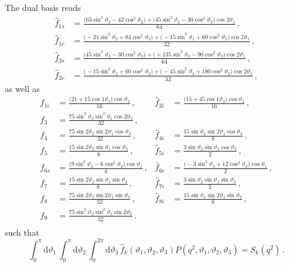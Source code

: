 \documentclass[aps,prd,reprint,nofootinbib,preprintnumbers]{revtex4}
\newcommand{\rmdx}[1]{\mbox{d} #1 \,} %
\renewcommand{\theta}{\vartheta}
\begin{document}
The dual basis reads
\begin{equation}
\begin{aligned}
    \hat{f}_{1s} & = \frac{\big( 63 \sin^2\theta_2 - 42 \cos^2\theta_2\big) + \big(  45 \sin^2\theta_2 - 30 \cos^2\theta_2\big)\cos 2\theta_1}{64} \,,\\
    \hat{f}_{1c} & = \frac{\big(-21 \sin^2\theta_2 + 84 \cos^2\theta_2\big) + \big( -15 \sin^2\theta_2 + 60 \cos^2\theta_2\big)\cos 2\theta_1}{32} \,,\\
    \hat{f}_{2s} & = \frac{\big( 45 \sin^2\theta_2 - 30 \cos^2\theta_2\big) + \big(+135 \sin^2\theta_2 - 90 \cos^2\theta_2\big)\cos 2\theta_1}{64} \,,\\
    \hat{f}_{2c} & = \frac{\big(-15 \sin^2\theta_2 + 60 \cos^2\theta_2\big) + \big( -45 \sin^2\theta_2 +180 \cos^2\theta_2\big)\cos 2\theta_1}{32} \,,
\end{aligned}
\end{equation}
as well as
\begin{equation}
\begin{aligned}
    \hat{f}_{1i} & = \frac{\big(21 + 15 \cos1\theta_2\big)\cos\theta_2}{16}               \,,&
    \hat{f}_{2i} & = \frac{\big(15 + 45 \cos1\theta_2\big)\cos\theta_2}{16}               \,,\\
    \hat{f}_{3}  & = \frac{75 \sin^2\theta_2 \sin^2\theta_1 \cos2\theta_3}{32}                \,,& &\\
    \hat{f}_{4}  & = \frac{75 \sin 2\theta_2 \sin 2\theta_1 \cos \theta_3}{32}                \,,&
    \hat{f}_{4i} & = \frac{15 \sin  \theta_2 \sin 2\theta_1 \cos \theta_3}{8}                 \,,\\
    \hat{f}_{5}  & = \frac{15 \sin 2\theta_2 \sin  \theta_1 \cos \theta_3}{8}                 \,,&
    \hat{f}_{5i} & = \frac{3  \sin  \theta_2 \sin  \theta_1 \cos \theta_3}{2}                 \,,\\
    \hat{f}_{6s} & = \frac{\big( 9\sin^2\theta_2 -  6 \cos^2\theta_2\big)\cos\theta_1}{4} \,,&
    \hat{f}_{6c} & = \frac{\big(-3\sin^2\theta_2 + 12 \cos^2\theta_2\big)\cos\theta_1}{2} \,,\\
    \hat{f}_{7}  & = \frac{15 \sin 2\theta_2 \sin  \theta_1 \sin \theta_3}{8}                 \,,&
    \hat{f}_{7i} & = \frac{3  \sin  \theta_2 \sin  \theta_1 \sin \theta_3}{2}                 \,,\\
    \hat{f}_{8}  & = \frac{75 \sin 2\theta_2 \sin 2\theta_1 \sin \theta_3}{32}                \,,&
    \hat{f}_{8i} & = \frac{15 \sin  \theta_2 \sin 2\theta_1 \sin \theta_3}{8}                 \,,\\
    \hat{f}_{9}  & = \frac{75 \sin^2\theta_2 \sin^2\theta_1 \sin2\theta_3}{32}                \,.\\
\end{aligned}
\end{equation}
such that
\begin{equation}
    \int_0^\pi \rmdx{\theta_1} \int_0^\pi \rmdx{\theta_2} \int_0^{2\pi} \rmdx{\theta_3} \hat{f}_k(\theta_1,\theta_2,\theta_3) P(q^2, \theta_1,\theta_2,\theta_3) = S_k(q^2)\,.
\end{equation}
\end{document}
